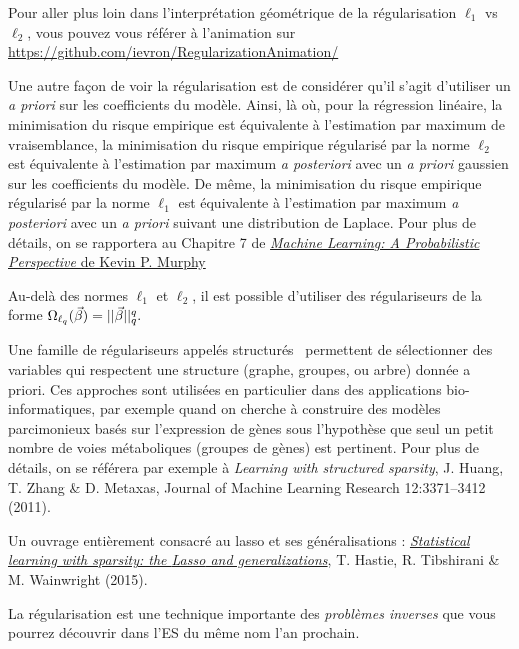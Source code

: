 \begin{plusloin}
\item Pour aller plus loin dans l'interprétation géométrique de la
  régularisation $\ell_1$ vs $\ell_2$, vous pouvez vous référer à l'animation
  sur
  \href{https://github.com/ievron/RegularizationAnimation/}{https://github.com/ievron/RegularizationAnimation/}
\item Une autre façon de voir la régularisation est de considérer qu'il s'agit
  d'utiliser un \textit{a priori} sur les coefficients du modèle. Ainsi, là où,
  pour la régression linéaire, la minimisation du risque empirique est
  équivalente à l'estimation par maximum de vraisemblance, la minimisation du
  risque empirique régularisé par la norme $\ell_2$ est équivalente à
  l'estimation par maximum \textit{a posteriori} avec un \textit{a priori} gaussien sur les
  coefficients du modèle. De même, la minimisation du risque empirique régularisé par
  la norme $\ell_1$ est équivalente à l'estimation  par maximum \textit{a posteriori} avec un \textit{a
    priori} suivant une distribution de Laplace. Pour plus de détails, on se
  rapportera au Chapitre 7 de
  \href{https://probml.github.io/pml-book/book0.html}{\textit{Machine Learning:
      A Probabilistic Perspective} de Kevin P. Murphy}
\item Au-delà des normes $\ell_1$ et $\ell_2$, il est possible d'utiliser des
  régulariseurs de la forme $\Omega_{\ell_q}(\bbeta) = ||\bbeta||_q^q.$
\item Une famille de régulariseurs appelés \og structurés \fg~permettent de
  sélectionner des variables qui respectent une structure (graphe, groupes, ou
  arbre) donnée a priori. Ces approches sont utilisées en particulier dans des
  applications bio-informatiques, par exemple quand on cherche à construire des
  modèles parcimonieux basés sur l'expression de gènes sous l'hypothèse que
  seul un petit nombre de voies métaboliques (groupes de gènes) est
  pertinent. Pour plus de détails, on se référera par exemple à
  \textit{Learning with structured sparsity}, J. Huang, T. Zhang \& D. Metaxas,
  Journal of Machine Learning Research 12:3371--3412 (2011).
\item Un ouvrage entièrement consacré au lasso et ses généralisations :
  \href{http://web.stanford.edu/~hastie/StatLearnSparsity/}{\textit{Statistical
      learning with sparsity: the {Lasso} and generalizations}}, T. Hastie,
  R. Tibshirani \& M. Wainwright (2015).
\item La régularisation est une technique importante des \textit{problèmes
    inverses} que vous pourrez découvrir dans l'ES du même nom l'an prochain. 
\end{plusloin}




